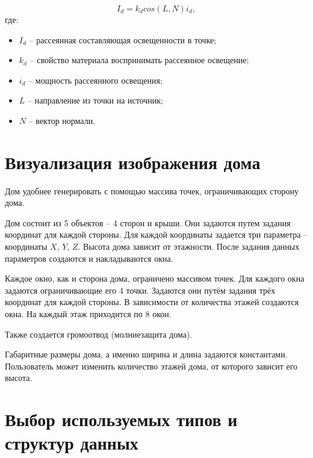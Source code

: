 \begin{equation}
	\label{eq:lambert}
	I_{d} = k_{d}  cos(L, N)  i_{d},
\end{equation}
где:
\begin{itemize}
	\item $I_{d}$ -- рассеянная составляющая освещенности в точке;
	\item $k_{d}$ -- свойство материала воспринимать рассеянное освещение;
	\item $i_{d}$ -- мощность рассеянного освещения;
	\item $L$ -- направление из точки на источник;
	\item $N$ -- вектор нормали.
\end{itemize}

\section{Визуализация изображения дома}
Дом удобнее генерировать с помощью массива точек, ограничивающих сторону дома.

Дом состоит из 5 объектов – 4 сторон и крыши. Они задаются путем задания координат для каждой стороны. Для каждой координаты задается три параметра – координаты $X$, $Y$, $Z$. Высота дома зависит от этажности. После задания данных параметров создаются и накладываются окна. 

Каждое окно, как и сторона дома, ограничено массивом точек. Для каждого окна задаются ограничивающие его 4 точки. Задаются они путём задания трёх координат для каждой стороны. В зависимости от количества этажей создаются окна. На каждый этаж приходится по 8 окон. 

Также создается громоотвод (молниезащита дома). 

Габаритные размеры дома, а именно ширина и длина задаются константами. Пользователь может изменить количество этажей дома, от которого зависит его высота.

\section{Выбор используемых типов и структур данных} 

